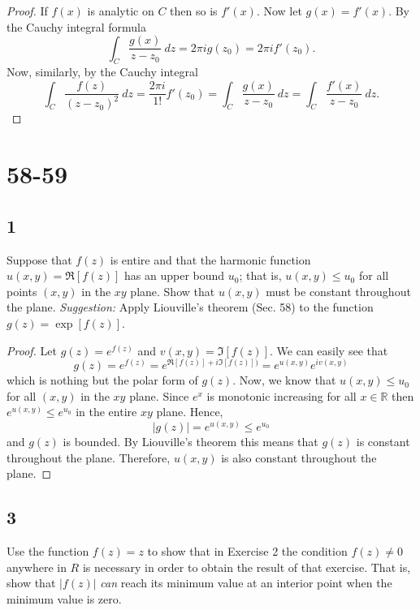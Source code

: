 \documentclass{article}
\newcommand{\R}{\mathbb{R}}
\begin{document}
\begin{proof}
    If $f(x)$ is analytic on $C$ then so is $f'(x)$. Now let $g(x) = f'(x)$.
    By the Cauchy integral formula
    \begin{equation*}
        \int_C \frac{g(x)}{z - z_0} \ dz = 2\pi i g(z_0) = 2\pi i f'(z_0).
    \end{equation*}
    Now, similarly, by the Cauchy integral
    \begin{equation}
        \int_C \frac{f(z)}{(z - z_0)^2} \ dz = \frac{2\pi i}{1!}f'(z_0)
        = \int_C \frac{g(x)}{z - z_0} \ dz = \int_C \frac{f'(x)}{z - z_0} \ dz.
    \end{equation}
\end{proof}

\section*{58-59}
\subsection*{1}
Suppose that $f(z)$ is entire and that the harmonic function $u(x,y) = \Re[f(z)]$
has an upper bound $u_0$; that is, $u(x,y) \leq u_0$ for all points $(x,y)$ in
the $xy$ plane. Show that $u(x,y)$ must be constant throughout the plane.
\textit{Suggestion:} Apply Liouville's theorem (Sec. 58) to the function
$g(z) = \exp[f(z)]$.

\begin{proof}
    Let $g(z) = e^{f(z)}$ and $v(x,y) = \Im[f(z)]$. We can easily see that
    \begin{equation*}
        g(z) = e^{f(z)} = e^{\Re[f(z)] + i\Im[f(z)])} = e^{u(x,y)}e^{iv(x,y)}
    \end{equation*}
    which is nothing but the polar form of $g(z)$. Now, we know that
    $u(x,y) \leq u_0$ for all $(x,y)$ in the $xy$ plane. Since $e^x$ is
    monotonic increasing for all $x \in \R$ then $e^{u(x,y)} \leq e^{u_0}$
    in the entire $xy$ plane. Hence,
    \begin{equation*}
        |g(z)| =  e^{u(x,y)} \leq e^{u_0}
    \end{equation*}
    and $g(z)$ is bounded. By Liouville's theorem this means that $g(z)$
    is constant throughout the plane. Therefore, $u(x,y)$ is also
    constant throughout the plane.
\end{proof}

\subsection*{3}
Use the function $f(z) = z$ to show that in Exercise 2 the condition $f(z) \neq 0$
anywhere in $R$ is necessary in order to obtain the result of that exercise.
That is, show that $|f(z)|$ \textit{can} reach its minimum value at an interior
point when the minimum value is zero.
\end{document}
